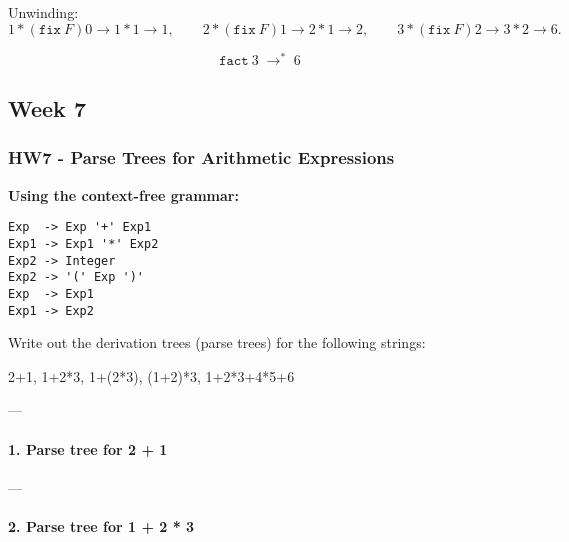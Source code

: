 \documentclass{article}
\theoremstyle{theorem}
\theoremstyle{definition}
\theoremstyle{remark}
\begin{document}
Unwinding:
\[
1 * (\mathtt{fix}\ F)0 \to 1 * 1 \to 1,\qquad
2 * (\mathtt{fix}\ F)1 \to 2 * 1 \to 2,\qquad
3 * (\mathtt{fix}\ F)2 \to 3 * 2 \to 6.
\]

\[
\boxed{\ \mathtt{fact}\ 3 \;\to^{\!*}\; 6\ }
\]


\subsection{Week 7}
\subsubsection{HW7 - Parse Trees for Arithmetic Expressions}

\textbf{Using the context-free grammar:}

\begin{verbatim}
Exp  -> Exp '+' Exp1
Exp1 -> Exp1 '*' Exp2
Exp2 -> Integer
Exp2 -> '(' Exp ')'
Exp  -> Exp1
Exp1 -> Exp2
\end{verbatim}

Write out the derivation trees (parse trees) for the following strings:

2+1,  1+2*3,  1+(2*3),  (1+2)*3,  1+2*3+4*5+6

---

\paragraph{1. Parse tree for 2 + 1}

\begin{center}
\end{center}

---

\paragraph{2. Parse tree for 1 + 2 * 3}

\begin{center}
\end{center}
\end{document}
